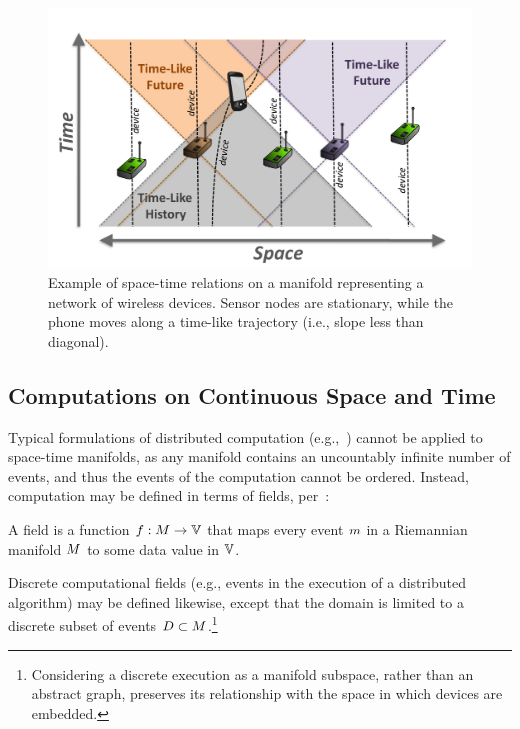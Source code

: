 \documentclass[12pt,a4paper,twoside,openright]{book}
\begin{document}
\begin{figure}
\centering
\includegraphics[width=\columnwidth]{img/spacetime}
\caption[Example of space-time relations on a manifold]{Example of space-time relations on a manifold representing a network of wireless devices.
  Sensor nodes are stationary, while the phone moves along a time-like trajectory (i.e., slope less than diagonal).
}
\label{f:spacetime}
\end{figure}

\subsection{Computations on Continuous Space and Time}

Typical formulations of distributed computation (e.g.,~\cite{Lynch:1996:DA:525656}) cannot be applied to space-time manifolds, as any manifold contains an uncountably infinite number of events, and thus the events of the computation cannot be ordered.
%
Instead, computation may be defined in terms of fields, per~\cite{bealBasisSCW10,BVD-SCW14,BealUsbeck12}:
\begin{thrdefn}
  A field is a function $\field: \manifold \rightarrow \spaceof{\datavalue}$ that maps every event $m$ in a Riemannian manifold $M$ to some data value in $\spaceof{\datavalue}$.
\end{thrdefn}
\noindent
Discrete computational fields (e.g., events in the execution of a distributed algorithm) may be defined likewise, except that the domain is limited to a discrete subset of events $D \subset M$.\footnote{Considering a discrete execution as a manifold subspace, rather than an abstract graph, preserves its relationship with the space in which devices are embedded.}
\end{document}
